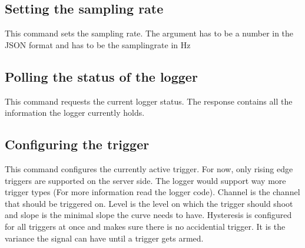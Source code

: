\subsection{Setting the sampling rate}

This command sets the sampling rate.
The  argument has  to  be a  number  in the  JSON  format and  has  to be  the
samplingrate in \si{\Hz}


\subsection{Polling the status of the logger}

This command requests the current logger status.
The response contains all the information the logger currently holds.


\subsection{Configuring the trigger}

This command configures the currently active trigger.
For  now, only  rising edge  triggers are  supported on  the server  side. The
logger would  support way more  trigger types  (For more information  read the
logger code).
Channel is the channel that should be triggered on.
Level is the level on which the  trigger should shoot and slope is the minimal
slope the curve needs to have.
Hysteresis is configured for  all triggers at once and makes  sure there is no
accidential trigger. It  is the variance the  signal can have until  a trigger
gets armed.

